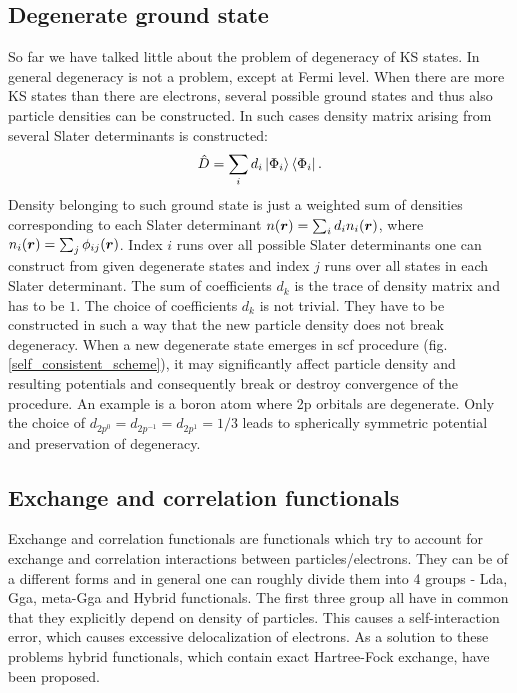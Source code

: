 \documentclass[openany, longbibliography,slovene,a4paper,12pt]{article}
\def\vec#1{\mbox{\boldmath$#1$}}
\begin{document}
\subsection{Degenerate ground state}
So far we have talked little about the problem of degeneracy of KS states. In
general degeneracy is not a problem, except at Fermi level. When there are more
KS states than there are electrons, several possible ground states and thus also
particle densities can be constructed. In such cases density matrix arising from
several Slater determinants is constructed:
\begin{equation}
  \hat D = \sum_i d_i\ket{\Phi_i} \bra{\Phi_i}.
  \end{equation}
Density belonging to such ground state is just a weighted sum of densities
corresponding to each Slater determinant $n(\vec r)=\sum_id_in_i(\vec r)$, where
$n_i(\vec r)=\sum_j\phi_{ij}(\vec r)$. Index $i$ runs over all possible
Slater determinants one can construct from given degenerate states and index $j$
runs over all states in each Slater determinant. The sum of coefficients $d_k$
is the trace of density matrix and has to be $1$. The choice of coefficients
$d_k$ is not trivial. They have to be constructed in such a way that the new
particle density does not break degeneracy. When a new degenerate state emerges in
scf procedure (fig. \ref{self_consistent_scheme}), it may significantly affect
particle density and resulting potentials and consequently break or destroy
convergence of the procedure. An example is a boron atom where 2p orbitals are
degenerate. Only the choice of $d_{2p^0}=d_{2p^{-1}}=d_{2p^1}=1/3$ leads to spherically symmetric potential and preservation of degeneracy\cite{advanced_course}.

\subsection{Exchange and correlation functionals}
Exchange and correlation functionals are functionals which try to account for
exchange and correlation interactions between particles/electrons. They can be of a
different forms and in general one can roughly divide them into 4 groups
\cite{challenges_den_fun_theor} - Lda, Gga, meta-Gga and Hybrid functionals.
The first three group all have in common that they explicitly depend on density
of particles. This causes a self-interaction error, which causes excessive
delocalization of electrons. As a solution to these problems hybrid
functionals, which contain exact Hartree-Fock exchange, have been proposed.
\end{document}

